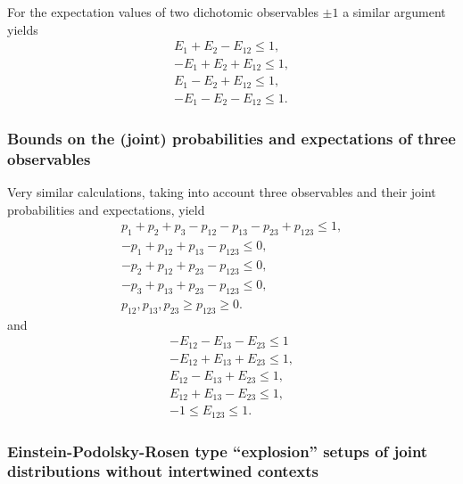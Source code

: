 For the expectation values  of two dichotomic observables  $\pm 1$   a similar argument yields
\begin{equation}
\begin{split}
  E_1 + E_2  - E_{12} \le 1 ,     \\
 -E_1 +E_2 +E_{12}   \le 1  ,     \\
  E_1  -E_2 + E_{12}    \le 1,    \\
 -E_1  -E_2  -E_{12}    \le 1.
\end{split}
\label{2017-b-1-2-E-c}
\end{equation}

\subsubsection*{Bounds on the (joint) probabilities and expectations of three observables}

Very similar calculations, taking into account three observables and their joint probabilities and expectations,
yield
\begin{equation}
\begin{split}
  p_1 +p_2 +p_3  -p_{12}  -p_{13}  -p_{23} +p_{123}  \le   1 ,\\
  -p_1   +p_{12} +p_{13}     -p_{123}  \le     0             ,\\
      -p_2    +p_{12}    +p_{23}  -p_{123}    \le    0       ,\\
         -p_3    +p_{13} +p_{23}  -p_{123}    \le    0        ,\\
    p_{12},p_{13},p_{23} \ge p_{123} \ge 0
.
\end{split}
\label{2017-b-1-3-p-i}
\end{equation}
and
\begin{equation}
\begin{split}
- E_{12}- E_{13}- E_{23}  \le  1
\\
- E_{12}+ E_{13}+ E_{23}  \le  1,
\\
 E_{12}- E_{13}+ E_{23}  \le  1,
\\
 E_{12}+ E_{13}- E_{23}  \le  1,
\\
-1\le E_{123}  \le 1
.
\end{split}
\label{2017-b-1-3-e-i}
\end{equation}



\subsubsection{Einstein-Podolsky-Rosen type ``explosion'' setups of joint distributions without intertwined contexts}

